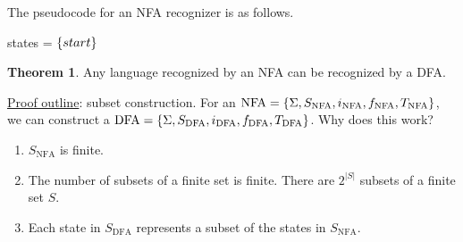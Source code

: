 \documentclass[]{article}
\DeclarePairedDelimiter{\set}{\lbrace}{\rbrace}
\theoremstyle{definition}
\newtheorem*{theorem}{Theorem}
\begin{document}
			The pseudocode for an NFA recognizer is as follows. \\
			\begin{algorithm}[H]
				states = $\set{start}$\;
			\end{algorithm}

			\begin{theorem}
				Any language recognized by an NFA can be recognized by a DFA.
			\end{theorem}

			\underline{Proof outline}: subset construction. For an $\text{NFA} = \set{\Sigma, S_{\text{NFA}}, i_{\text{NFA}}, f_{\text{NFA}}, T_{\text{NFA}}}$, we can construct a $\text{DFA} = \set{\Sigma, S_{\text{DFA}}, i_{\text{DFA}}, f_{\text{DFA}}, T_{\text{DFA}}}$. Why does this work?
			\begin{enumerate}
				\item $S_{\text{NFA}}$ is finite.
				\item The number of subsets of a finite set is finite. There are $2^{|S|}$ subsets of a finite set $S$.
				\item Each state in $S_{\text{DFA}}$ represents a subset of the states in $S_{\text{NFA}}$.
			\end{enumerate}
\end{document}
